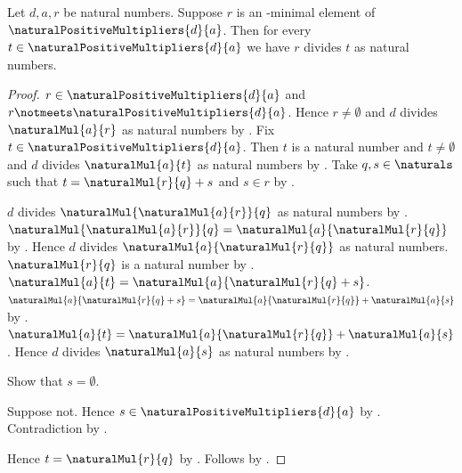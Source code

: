 \begin{theorem}\label{least_positive_multiplier_divides_all}
    Let $d,a,r$ be natural numbers.
    Suppose $r$ is an \in-minimal element of
        $\naturalPositiveMultipliers{d}{a}$.
    Then for every $t\in\naturalPositiveMultipliers{d}{a}$ we have
        $r$ divides $t$ as natural numbers.
\end{theorem}
\begin{proof}
    $r\in\naturalPositiveMultipliers{d}{a}$ and
        $r\notmeets\naturalPositiveMultipliers{d}{a}$.
    Hence $r\neq\emptyset$ and
        $d$ divides $\naturalMul{a}{r}$ as natural numbers
        by .
    Fix $t\in\naturalPositiveMultipliers{d}{a}$.
    Then $t$ is a natural number and $t\neq\emptyset$ and
        $d$ divides $\naturalMul{a}{t}$ as natural numbers
        by .
    Take $q,s\in\naturals$ such that
        $t=\naturalMul{r}{q}+s$ and $s\in r$
        by .

    $d$ divides $\naturalMul{\naturalMul{a}{r}}{q}$ as natural numbers
        by .
    $\naturalMul{\naturalMul{a}{r}}{q}
        =\naturalMul{a}{\naturalMul{r}{q}}$
        by .
    Hence $d$ divides $\naturalMul{a}{\naturalMul{r}{q}}$
        as natural numbers.
    $\naturalMul{r}{q}$ is a natural number
        by .
    $\naturalMul{a}{t}
        =\naturalMul{a}{\naturalMul{r}{q}+s}$.
    $\naturalMul{a}{\naturalMul{r}{q}+s}
        =\naturalMul{a}{\naturalMul{r}{q}}+\naturalMul{a}{s}$
        by .
    $\naturalMul{a}{t}
        =\naturalMul{a}{\naturalMul{r}{q}}+\naturalMul{a}{s}$.
    Hence $d$ divides $\naturalMul{a}{s}$ as natural numbers
        by .

    Show that $s=\emptyset$.
    \begin{subproof}
        Suppose not.
        Hence $s\in\naturalPositiveMultipliers{d}{a}$
            by .
        Contradiction by .
    \end{subproof}
    Hence $t=\naturalMul{r}{q}$
        by .
    Follows by .
\end{proof}

